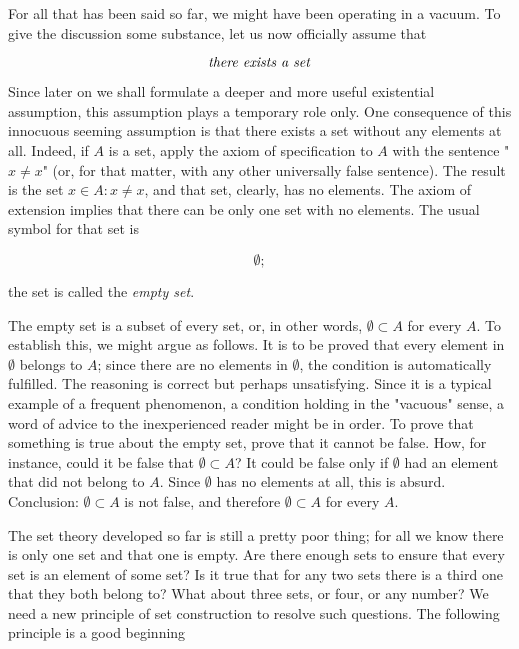 
For all that has been said so far, we might have been operating in a vacuum. To give the discussion some substance, let us now officially assume that

\begin{equation*}
\text{ \textit{there exists a set} }
\end{equation*}
 
Since later on we shall formulate a deeper and more useful existential assumption, this  assumption  plays  a temporary role only. One consequence of this innocuous seeming assumption is that there exists a set without any elements at all. Indeed, if $A$ is a set, apply the axiom of specification to $A$ with the sentence "$ x \neq x $"  (or, for that matter, with any other universally false sentence). The result is the set ${x \in A: x \neq x}$, and that set, clearly, has no elements. The axiom of extension implies that there can be only one set with no elements. The usual symbol for that set is 

\begin{equation*}
\emptyset ;
\end{equation*}


the set is called the \textit{empty set}. 

The empty set is a subset of every set, or, in other words, $ \emptyset \subset A$ for every $A$. To establish this, we might argue as follows. It is to be proved that every element in $ \emptyset $ belongs to $A$; since there are no elements in $ \emptyset $, the condition is automatically fulfilled. The reasoning is correct but perhaps unsatisfying. Since it is a typical example of a frequent phenomenon, a condition holding in the "vacuous" sense, a word of advice to the inexperienced reader might be in order. To prove that something is true about the empty set, prove that it cannot be false. How, for instance, could it be false that $ \emptyset \subset A$? It could be false only if $ \emptyset $ had an element that did not belong to $A$. Since $ \emptyset $ has no elements at all, this is absurd. Conclusion: $ \emptyset \subset A$ is not false, and therefore $ \emptyset \subset A$ for every $A$.

The set theory developed so far is still a pretty poor thing; for all we know there is only one set and that one is empty. Are there enough sets to ensure that every set is an element of some set? Is it true that for any two sets there is a third one that they both belong to? What about three sets, or four, or any number? We need a new principle of set construction to resolve such questions. The following principle is a good beginning 

